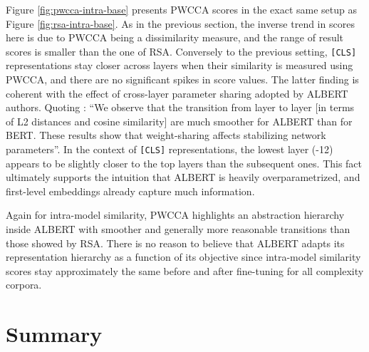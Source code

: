 \documentclass[a4paper, nobind]{templates/ociamthesis}
\begin{document}
Figure \ref{fig:pwcca-intra-base} presents PWCCA scores in the exact same setup as Figure \ref{fig:rsa-intra-base}. As in the previous section, the inverse trend in scores here is due to PWCCA being a dissimilarity measure, and the range of result scores is smaller than the one of RSA. Conversely to the previous setting, \texttt{{[}CLS{]}} representations stay closer across layers when their similarity is measured using PWCCA, and there are no significant spikes in score values. The latter finding is coherent with the effect of cross-layer parameter sharing adopted by ALBERT authors. Quoting \textcite{lan-etal-2020-albert}: ``We observe that the transition from layer to layer {[}in terms of L2 distances and cosine similarity{]} are much smoother for ALBERT than for BERT. These results show that weight-sharing affects stabilizing network parameters''. In the context of \texttt{{[}CLS{]}} representations, the lowest layer (-12) appears to be slightly closer to the top layers than the subsequent ones. This fact ultimately supports the intuition that ALBERT is heavily overparametrized, and first-level embeddings already capture much information.

Again for intra-model similarity, PWCCA highlights an abstraction hierarchy inside ALBERT with smoother and generally more reasonable transitions than those showed by RSA. There is no reason to believe that ALBERT adapts its representation hierarchy as a function of its objective since intra-model similarity scores stay approximately the same before and after fine-tuning for all complexity corpora.

\hypertarget{subchap:ex2-summary}{%
\section{Summary}\label{subchap:ex2-summary}}
\end{document}
